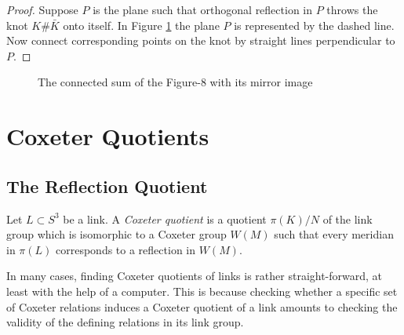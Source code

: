 \documentclass{article}
\theoremstyle{definition}
\begin{document}
\begin{proof}%
Suppose $P$ is the plane such that orthogonal reflection in $P$ throws the knot $K\#\bar{K}$ onto itself. In Figure \ref{fig:connected-sum-figure-8} the plane $P$ is represented by the dashed line. Now connect corresponding points on the knot by straight lines perpendicular to $P$. 
\end{proof}

\begin{figure}[htb]
\centering
{}
\caption{The connected sum of the Figure-8 with its mirror image}
\label{fig:connected-sum-figure-8}
\end{figure}
\newpage

\section{Coxeter Quotients}
\subsection{The Reflection Quotient}\label{subsec:reflection-quotient}
Let $L \subset S^3$ be a link. A \textit{Coxeter quotient} is a quotient $\pi(K)/N$ of the link group which is isomorphic to a Coxeter group $W(M)$ such that every meridian in $\pi(L)$ corresponds to a reflection in $W(M)$.

In many cases, finding Coxeter quotients of links is rather straight-forward, at least with the help of a computer. This is because checking whether a specific set of Coxeter relations induces a Coxeter quotient of a link amounts to checking the validity of the defining relations in its link group.
\end{document}
